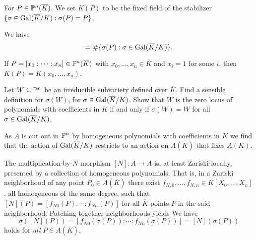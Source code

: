 \begin{definition}
  For $P\in {\mathbb{P}}^n(\overline K)$. 
  We set $K(P)$ to be the fixed field of the stabilizer
  $\{\sigma\in \mathrm{Gal}(\overline{K}/K) : \sigma(P)=P\}$. 
\end{definition}

We have
\begin{equation*}
  [K(P):K]  = \#\{\sigma(P) : \sigma\in\absgalk \}. 
\end{equation*}

If $P=[x_0:\cdots:x_n] \in {\mathbb{P}}^n(\overline K)$ with
$x_0,\ldots,x_n\in\overline K$ and $x_i=1$ for some
$i$, then $K(P) = K(x_0,\ldots,x_n)$. 

\begin{exercise}
  Let $W\subseteq{\mathbb{P}}^n$ be an irreducible subvariety defined
  over $\overline K$. Find a sensible definition for $\sigma(W)$,
  for $\sigma\in \mathrm{Gal}(\overline{K}/K)$.  Show that $W$ is the zero locus of
  polynomials with coefficients in $K$ if and only if $\sigma(W)=W$
  for all $\sigma\in \mathrm{Gal}(\overline{K}/K)$.
\end{exercise}


As $A$ is cut out in ${\mathbb{P}}^n$ by homogeneous polynomials with
coefficients in $K$ we find that the action of $\mathrm{Gal}(\overline{K}/K)$ restricts to
an action on $A(\overline K)$ that fixes $A(K)$.

The multiplication-by-$N$ morphism
$[N]\colon A\rightarrow A$ is, at least Zariski-locally, presented
by a collection of homogeneous polynomials. That is, in a Zariski
neighborhood of any point $P_0\in A(\overline K)$ there exist
$f_{N,0},\ldots,f_{N,n}\in K[X_0,\ldots,X_n]$, all homogeneous of the
same degree, such that $[N](P) = [f_{N0}(P):\cdots:f_{Nn}(P)]$ for all
$\overline K$-points $P$ in the said neighborhood. Patching together
neighborhoods yields We have
$$\sigma([N](P)) = [f_{N0}(\sigma(P)):\cdots:f_{Nn}(\sigma(P))] =
[N](\sigma(P))$$
holds for \textit{all} $P\in A(\overline K)$.


